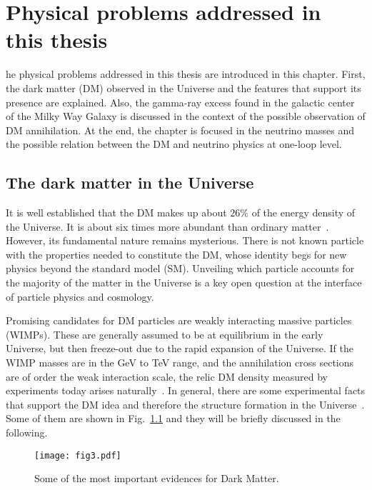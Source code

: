\chapter{Physical problems addressed in this thesis} 
%
he physical problems addressed in this thesis are introduced in this chapter. 
First, the dark matter (DM) observed in the Universe and the features that support its presence are explained. 
Also, the gamma-ray excess found in the galactic center of the Milky Way Galaxy is discussed in the context of the possible observation of DM annihilation. 
At the end, the chapter is focused in the neutrino masses and the possible relation between the DM and neutrino physics at one-loop level.  










\section{The dark matter in the Universe}
\label{sec:intro-dark-matter}
%
It is well established that the DM makes up about $26\%$ of the energy density of the Universe. It is about six times more abundant than ordinary matter~\cite{Ade:2015xua}.
However, its fundamental nature remains mysterious.
There is not known particle with the properties needed to constitute the DM, whose identity begs for new physics beyond the standard model (SM).
Unveiling which particle accounts for the majority of the matter in the Universe is a key open question at the interface of particle physics and cosmology.

Promising candidates for DM particles are weakly interacting massive particles (WIMPs).
These are generally assumed to be at equilibrium in the early Universe, but then freeze-out due to the rapid expansion of the Universe.
If the WIMP masses are in the GeV to TeV range, and the annihilation cross sections are of order the weak interaction scale, the relic DM density measured by experiments today arises naturally~\cite{Kolb:1990vq}.
% 
% 
In general, there are some experimental facts that support the DM idea and therefore the structure formation in the Universe~\cite{Kolb:1990vq}. 
Some of them are shown in Fig.~\ref{fig:evidences} and they will be briefly discussed in the following. 
%
\begin{figure}[h]
\centering
\texttt{[image: fig3.pdf]}
\caption{Some of the most important evidences for Dark Matter.}
\label{fig:evidences}
\end{figure}










